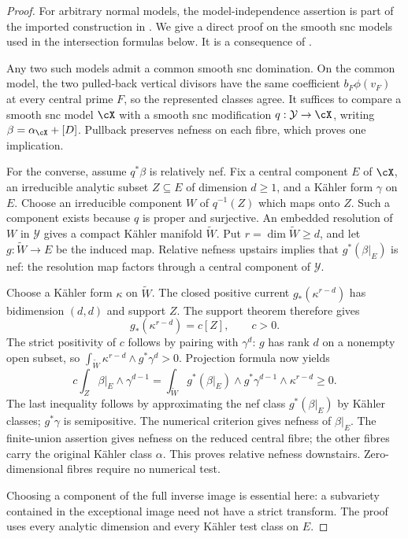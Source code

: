 \begin{proof}
For arbitrary normal models, the model-independence assertion is part of
the imported construction in \cite[Definition~4.1.2, p.~33]{MPTropicalV2}.
We give a direct proof on the smooth snc models used in the intersection
formulas below.  It is a consequence of
\cite[Theorem~4.3(iii), Proposition~3.3(ii)]{DP04}.

Any two such models admit a common smooth snc domination.  On the common
model, the two pulled-back vertical divisors have the same coefficient
$b_F\phi(v_F)$ at every central prime $F$, so the represented classes
agree.  It suffices to compare a smooth snc model $\cX$ with a smooth
snc modification $q:\mathcal Y\to\cX$, writing
$\beta=\alpha_{\cX}+[D]$.  Pullback preserves nefness on each fibre,
which proves one implication.

For the converse, assume $q^*\beta$ is relatively nef.  Fix a central
component $E$ of $\cX$, an irreducible analytic subset $Z\subseteq E$
of dimension $d\geq1$, and a K\"ahler form $\gamma$ on $E$.
Choose an irreducible component $W$ of $q^{-1}(Z)$ which maps onto $Z$.
Such a component exists because $q$ is proper and surjective.  An embedded
resolution of $W$ in $\mathcal Y$ gives a compact K\"ahler manifold
$\widetilde W$.  Put
$r=\dim\widetilde W\geq d$, and let
$g:\widetilde W\to E$ be the induced map.  Relative nefness upstairs
implies that $g^*(\beta|_E)$ is nef: the resolution map factors through
a central component of $\mathcal Y$.

Choose a K\"ahler form $\kappa$ on $\widetilde W$.  The closed positive
current $g_*(\kappa^{r-d})$ has bidimension $(d,d)$ and support $Z$.
The support theorem therefore gives
\[
                 g_*(\kappa^{r-d})=c[Z],\qquad c>0.
\]
The strict positivity of $c$ follows by pairing with $\gamma^d$:
$g$ has rank $d$ on a nonempty open subset, so
$\int_{\widetilde W}\kappa^{r-d}\wedge g^*\gamma^d>0$.
Projection formula now yields
\[
 c\int_Z\beta|_E\wedge\gamma^{d-1}
 =\int_{\widetilde W}
      g^*(\beta|_E)\wedge g^*\gamma^{d-1}\wedge\kappa^{r-d}
 \geq0.
\]
The last inequality follows by approximating the nef class
$g^*(\beta|_E)$ by K\"ahler classes; $g^*\gamma$ is semipositive.
The numerical criterion gives nefness of $\beta|_E$.  The finite-union
assertion gives nefness on the reduced central fibre; the other fibres
carry the original K\"ahler class $\alpha$.  This proves relative nefness
downstairs.  Zero-dimensional fibres require no numerical test.

Choosing a component of the full inverse image is essential here: a
subvariety contained in the exceptional image need not have a strict
transform.  The proof uses every analytic dimension and every K\"ahler
test class on $E$.
\end{proof}

